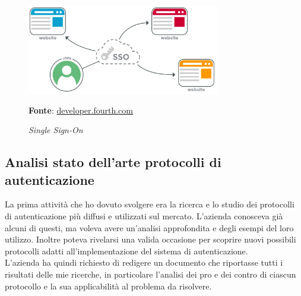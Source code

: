     \begin{figure}[h]
        \centering
        \includegraphics[width=0.75\textwidth]{immagini/sso.png}
        \caption{\textit{Single Sign-On}}
        \textbf{Fonte}:
        \href{https://developer.fourth.com/en-gb/docs/single-sign-saml}{developer.fourth.com}
        \label{fig: Single Sign-On}
    \end{figure}


    \subsection{Analisi stato dell'arte protocolli di autenticazione}\label{sec:att_analisi}
    La prima attività che ho dovuto svolgere era la ricerca e lo studio dei protocolli di autenticazione più diffusi e utilizzati sul mercato. L'azienda conosceva già alcuni di questi, ma voleva avere un'analisi approfondita e degli esempi del loro utilizzo. Inoltre poteva rivelarsi una valida occasione per scoprire nuovi possibili protocolli adatti all'implementazione del sistema di autenticazione. \\
    L'azienda ha quindi richiesto di redigere un documento che riportasse tutti i risultati delle mie ricerche, in particolare l'analisi dei pro e dei contro di ciascun protocollo e la sua applicabilità al problema da risolvere.

